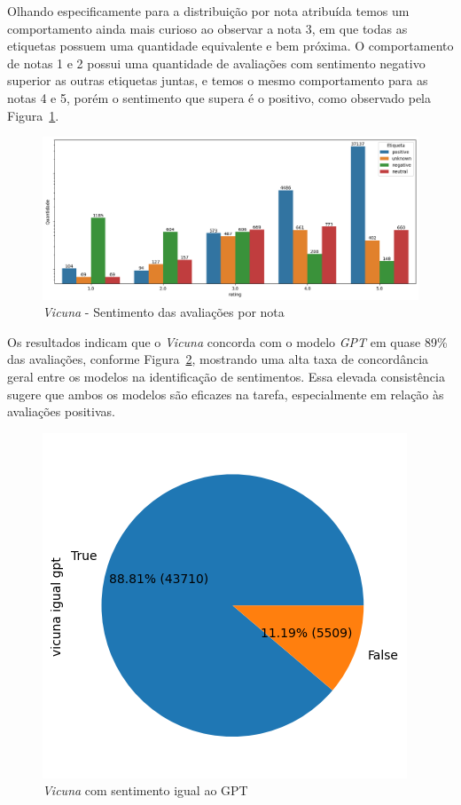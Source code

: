 Olhando especificamente para a distribuição por nota atribuída temos um comportamento ainda mais curioso ao observar a nota 3, em que todas as etiquetas possuem uma quantidade equivalente e bem próxima. O comportamento de notas 1 e 2 possui uma quantidade de avaliações com sentimento negativo superior as outras etiquetas juntas, e temos o mesmo comportamento para as notas 4 e 5, porém o sentimento que supera é o positivo, como observado pela Figura~\ref{img:vicuna_sentimento_nota}.

\begin{figure}
	\centering
	\includegraphics[width=1\textwidth]{figs/vicuna/sentimento_nota.png}
	\caption{\textit{Vicuna} - Sentimento das avaliações por nota}
	\label{img:vicuna_sentimento_nota}
\end{figure}

Os resultados indicam que o \textit{Vicuna} concorda com o modelo \textit{GPT} em quase 89\% das avaliações, conforme Figura~\ref{img:vicuna_vs_gpt}, mostrando uma alta taxa de concordância geral entre os modelos na identificação de sentimentos. Essa elevada consistência sugere que ambos os modelos são eficazes na tarefa, especialmente em relação às avaliações positivas.

\begin{figure}
	\centering
	\includegraphics{figs/vicuna/vs_gpt.png}
	\caption{\textit{Vicuna} com sentimento igual ao GPT}
	\label{img:vicuna_vs_gpt}
\end{figure}

